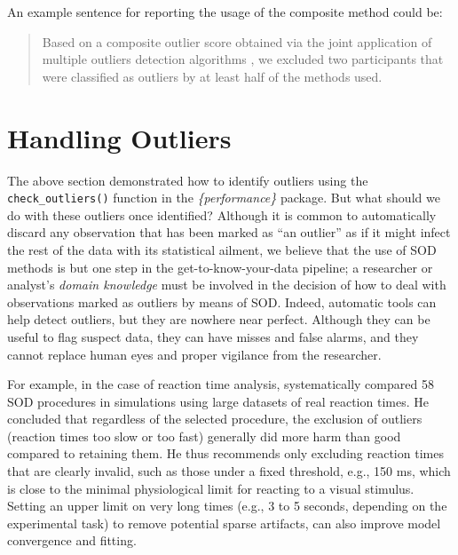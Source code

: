 \documentclass[sn-basic, lineno,pdflatex]{sn-jnl}
\begin{document}
An example sentence for reporting the usage of the composite method
could be:

\begin{quote}
Based on a composite outlier score \citep[see the `check\_outliers()'
function in the `performance' R package,][]{ludecke2021performance}
obtained via the joint application of multiple outliers detection
algorithms \citetext{\citealp[(a) median absolute deviation (MAD)-based
robust \emph{z} scores,][]{leys2013outliers}; \citealp[(b) Mahalanobis
minimum covariance determinant (MCD),][]{leys2019outliers}; \citealp[and
(c) Cook's distance,][]{cook1977detection}}, we excluded two
participants that were classified as outliers by at least half of the
methods used.
\end{quote}

\hypertarget{handling-outliers}{%
\section{Handling Outliers}\label{handling-outliers}}

The above section demonstrated how to identify outliers using the
\texttt{check\_outliers()} function in the \emph{\{performance\}}
package. But what should we do with these outliers once identified?
Although it is common to automatically discard any observation that has
been marked as ``an outlier'' as if it might infect the rest of the data
with its statistical ailment, we believe that the use of SOD methods is
but one step in the get-to-know-your-data pipeline; a researcher or
analyst's \emph{domain knowledge} must be involved in the decision of
how to deal with observations marked as outliers by means of SOD.
Indeed, automatic tools can help detect outliers, but they are nowhere
near perfect. Although they can be useful to flag suspect data, they can
have misses and false alarms, and they cannot replace human eyes and
proper vigilance from the researcher.

For example, in the case of reaction time analysis,
\citet{miller2023outlier} systematically compared 58 SOD procedures in
simulations using large datasets of real reaction times. He concluded
that regardless of the selected procedure, the exclusion of outliers
(reaction times too slow or too fast) generally did more harm than good
compared to retaining them. He thus recommends only excluding reaction
times that are clearly invalid, such as those under a fixed threshold,
e.g., 150 ms, which is close to the minimal physiological limit for
reacting to a visual stimulus. Setting an upper limit on very long times
(e.g., 3 to 5 seconds, depending on the experimental task) to remove
potential sparse artifacts, can also improve model convergence and
fitting.
\end{document}
